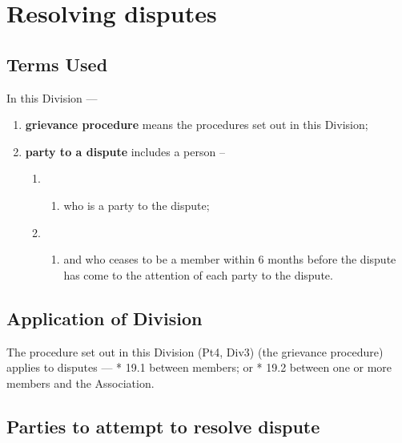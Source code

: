 \documentclass[../constitution.tex]{subfiles}
\begin{document}
\hypertarget{division-3-resolving-disputes}{%
\section{Resolving disputes}\label{division-3-resolving-disputes}}

\hypertarget{terms-used}{%
\subsection{Terms Used}\label{terms-used}}

In this Division ---

\begin{enumerate}

\item \textbf{grievance procedure} means the procedures set out in this Division;
\item \textbf{party to a dispute} includes a person --

  \begin{enumerate}
  \item \begin{enumerate}
    \def\labelenumi{\alph{enumi})}
    
    \item who is a party to the dispute;
    \end{enumerate}
  \item \begin{enumerate}
    \def\labelenumi{\alph{enumi})}
    \setcounter{enumi}{1}
    
    \item and who ceases to be a member within 6 months before the dispute has come to the attention of each party to the dispute.
    \end{enumerate}
  \end{enumerate}
\end{enumerate}

\hypertarget{application-of-division}{%
\subsection{Application of Division}\label{application-of-division}}

The procedure set out in this Division (Pt4, Div3) (the grievance procedure) applies to disputes --- * 19.1 between members; or * 19.2 between one or more members and the Association.

\hypertarget{parties-to-attempt-to-resolve-dispute}{%
\subsection{Parties to attempt to resolve dispute}\label{parties-to-attempt-to-resolve-dispute}}
\end{document}
